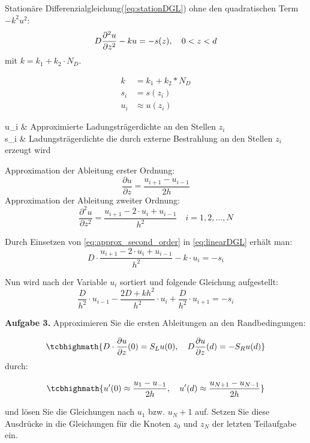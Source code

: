 Stationäre Differenzialgleichung(\cref{eq:stationDGL}) ohne den quadratischen
Term $-k^2u^2$:
\begin{equation}\label{eq:linearDGL}
	D \pdv[2]{u}{z} -ku=-s(z), \quad 0 <z<d
\end{equation}
mit $k=k_1+k_2\cdot N_D$.

\begin{align*}
	k   & =k_1+k_2*N_D   \\
	s_i & = s(z_i)       \\
	u_i & \approx u(z_i)
\end{align*}
\begin{conditions}
	u_i & Approximierte Ladungsträgerdichte an den Stellen $z_i$ \\
	s_i & Ladungsträgerdichte die durch externe Bestrahlung an den Stellen
	$z_i$ erzeugt wird
\end{conditions}

Approximation der Ableitung erster Ordnung:
\begin{equation}\label{eq:approx_first_order}
	\frac{\partial u}{\partial z} = \frac{u_{i+1} - u_{i-1}}{2h}
\end{equation}
Approximation der Ableitung zweiter Ordnung:
\begin{equation}\label{eq:approx_second_order}
	\frac{\partial ^2 u }{\partial z^2} = \frac{u_{i+1} - 2\cdot u_i +
		u_{i-1}}{h^2} \quad i=1,2,\dots,N
\end{equation}

Durch Einsetzen von \cref{eq:approx_second_order} in \cref{eq:linearDGL} erhält
man:
\begin{equation}\label{eq:stationare_approx}
	D\cdot\frac{u_{i+1} - 2\cdot u_i + u_{i-1}}{h^2} -k\cdot u_i = -s_i
\end{equation}

\begin{qed}
	Nun wird nach der Variable $u_i$ sortiert und folgende Gleichung aufgestellt:
	\begin{equation}
		\frac{D}{h^2}\cdot u_{i-1} - \frac{2D+kh^2}{h^2}\cdot u_i +
		\frac{D}{h^2}\cdot u_{i+1} = -s_i
	\end{equation}
\end{qed}

\begin{mybox}
	\textbf{Aufgabe 3.}	Approximieren Sie die ersten Ableitungen an den
	Randbedingungen:

	\begin{equation}
		\tcbhighmath{	D\cdot \frac{\partial u}{\partial z}(0)=S_Lu(0),\quad
			D\frac{\partial u}{\partial z}(d)=-S_Ru(d)}
	\end{equation}
	durch:

	\begin{equation}
		\tcbhighmath{	u'(0) \approx \frac{u_1-u_{-1}}{2h}, \quad u'(d)
		\approx \frac{u_{N+1}-u_{N-1}}{2h}}
	\end{equation}

	und lösen Sie die Gleichungen nach $u_1$ bzw. $u_N+1$ auf. Setzen Sie
	diese Ausdrücke in die Gleichungen für die Knoten $z_0$ und $z_N$ der letzten
	Teilaufgabe ein.
\end{mybox}

